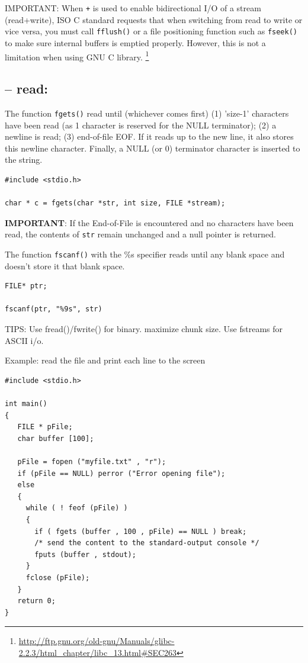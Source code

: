 IMPORTANT: When \verb!+! is used to enable bidirectional I/O of a stream
(read+write), ISO C standard requests that when switching from read to write or
vice versa, you must call \verb!fflush()! or a file positioning function such as
\verb!fseek()! to make sure internal buffers is emptied properly. However, this
is not a limitation when using GNU C library. 
\footnote{\url{http://ftp.gnu.org/old-gnu/Manuals/glibc-2.2.3/html_chapter/libc_13.html\#SEC263}}

\subsection{-- read: }

The function \verb!fgets()! read until (whichever comes first) (1) 'size-1'
characters have been read (as 1 character is reserved for the NULL terminator);
(2) a newline is read; (3) end-of-file EOF.
If it reads up to the new line, it also stores this newline character. Finally,
a NULL (or 0) terminator character is inserted to the string.

\begin{verbatim}
#include <stdio.h>

char * c = fgets(char *str, int size, FILE *stream);
\end{verbatim}

{\bf IMPORTANT}: If the End-of-File is encountered and no characters have been
read, the contents of \verb!str! remain unchanged and a null pointer is
returned.


The function \verb!fscanf()! with the \%s specifier reads until any blank space
and doesn't store it that blank space.
\begin{verbatim}
FILE* ptr;

fscanf(ptr, "%9s", str)
\end{verbatim}

TIPS: Use fread()/fwrite() for binary. maximize chunk size. Use fstreams for
ASCII i/o. 

Example: read the file and print each line to the screen
\begin{verbatim}
#include <stdio.h>

int main()
{
   FILE * pFile;
   char buffer [100];

   pFile = fopen ("myfile.txt" , "r");
   if (pFile == NULL) perror ("Error opening file");
   else
   {
     while ( ! feof (pFile) )
     {
       if ( fgets (buffer , 100 , pFile) == NULL ) break;
       /* send the content to the standard-output console */
       fputs (buffer , stdout);
     }
     fclose (pFile);
   }
   return 0;
}
\end{verbatim}


